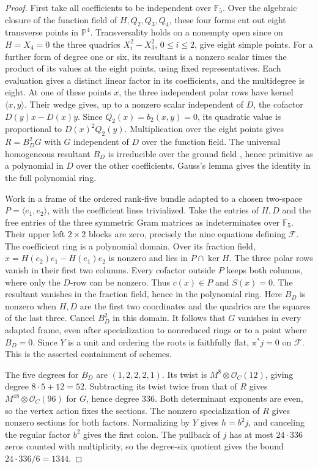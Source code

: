 \begin{proof}
First take all coefficients to be independent over \(\mathbb F_5\).
Over the algebraic closure of the function field of \(H,Q_2,Q_3,Q_4\),
these four forms cut out eight transverse points in \(\mathbb P^4\).
Transversality holds on a nonempty open since on \(H=X_4=0\)
the three quadrics \(X_i^2-X_3^2\), \(0\le i\le2\), give eight simple points.
For a further form of degree one or six, its resultant is a nonzero
scalar times the product of its values at the eight points, using
fixed representatives. Each evaluation gives a distinct linear
factor in its coefficients, and the multidegree is eight.
At one of these points \(x\), the three independent polar rows have
kernel \(\langle x,y\rangle\). Their wedge gives, up to a nonzero
scalar independent of \(D\), the cofactor
\(D(y)x-D(x)y\). Since \(Q_2(x)=b_2(x,y)=0\), its quadratic value
is proportional to \(D(x)^2Q_2(y)\). Multiplication over the eight
points gives \(R=B_D^2 G\) with \(G\) independent of \(D\) over the
function field. The universal homogeneous resultant \(B_D\) is
irreducible over the ground field \cite{jouanolouResultant}, hence
primitive as a polynomial in \(D\) over the other coefficients.
Gauss's lemma gives the identity in the full polynomial ring.

Work in a frame of the ordered rank-five bundle adapted to a chosen
two-space \(P=\langle e_1,e_2\rangle\), with the coefficient lines
trivialized. Take the entries of \(H,D\) and the free entries of the
three symmetric Gram matrices as indeterminates over \(\mathbb F_5\).
Their upper left \(2\times 2\) blocks are zero, precisely the nine
equations defining \(\mathcal F\). The coefficient ring is a polynomial
domain. Over its fraction field,
\(x=H(e_2)e_1-H(e_1)e_2\) is nonzero and lies in \(P\cap\ker H\).
The three polar rows vanish in their first two columns. Every cofactor
outside \(P\) keeps both columns, where only the \(D\)-row can be
nonzero. Thus \(c(x)\in P\) and \(S(x)=0\). The resultant
vanishes in the fraction field, hence in the polynomial ring.
Here \(B_D\) is nonzero when \(H,D\) are the first two
coordinates and the quadrics are the squares of the last three.
Cancel \(B_D^2\) in this domain. It follows that \(G\) vanishes in
every adapted frame, even after specialization to nonreduced rings or
to a point where \(B_D=0\). Since \(Y\) is a unit and ordering the
roots is faithfully flat, \(\pi^*j=0\) on \(\mathcal F\). This is the
asserted containment of schemes.

The five degrees for \(B_D\) are \((1,2,2,2,1)\). Its twist is
\(M^8\otimes\mathcal O_C(12)\), giving degree \(8\cdot5+12=52\).
Subtracting its twist twice from that of \(R\) gives
\(M^{48}\otimes\mathcal O_C(96)\) for \(G\), hence degree 336.
Both determinant exponents are even, so the vertex action fixes the
sections. The nonzero specialization of \(R\) gives nonzero sections
for both factors. Normalizing by \(Y\) gives \(h=b^2j\), and
canceling the regular factor \(b^2\) gives the first colon. The pullback
of \(j\) has at most \(24\cdot336\) zeros counted with multiplicity, so
the degree-six quotient gives the bound \(24\cdot336/6=1344\).


\end{proof}
